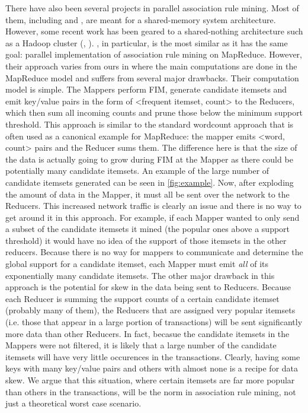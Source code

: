 \documentclass[11pt]{article}
\begin{document}
There have also been several projects in parallel association rule
mining. Most of them, including \cite{Agrawal1996} and
\cite{Zaki1997}, are meant for a shared-memory system architecture.
However, some recent work has been geared to a shared-nothing
architecture such as a Hadoop cluster (\cite{Li2008},
\cite{Li2011}). \cite{Yang2010}, in particular, is the most similar as
it has the same goal: parallel implementation of association rule
mining on MapReduce. However, their approach varies from ours in where
the main computations are done in the MapReduce model and suffers from
several major drawbacks. Their computation model is simple. The
Mappers perform FIM, generate candidate itemsets and emit key/value
pairs in the form of <frequent itemset, count> to the Reducers, which
then sum all incoming counts and prune those below the minimum support
threshold. This approach is similar to the standard wordcount approach
that is often used as a canonical example for MapReduce: the mapper
emits <word, count> pairs and the Reducer sums them. The difference
here is that the size of the data is actually going to grow during FIM
at the Mapper as there could be potentially many candidate
itemsets. An example of the large number of candidate itemsets
generated can be seen in \ref{fig:example}. Now, after exploding the
amount of data in the Mapper, it must all be sent over the network to
the Reducers. This increased network traffic is clearly an issue and
there is no way to get around it in this approach. For example, if
each Mapper wanted to only send a subset of the candidate itemsets it
mined (the popular ones above a support threshold) it would have no
idea of the support of those itemsets in the other reducers. Because
there is no way for mappers to communicate and determine the global
support for a candidate itemset, each Mapper must emit \emph{all} of
its exponentially many candidate itemsets. The other major drawback in
this approach is the potential for skew in the data being sent to
Reducers. Because each Reducer is summing the support counts of a
certain candidate itemset (probably many of them), the Reducers that
are assigned very popular itemsets (i.e. those that appear in a large
portion of transactions) will be sent significantly more data than
other Reducers. In fact, becasue the candidate itemsets in the Mappers
were not filtered, it is likely that a large number of the candidate
itemsets will have very little occurences in the
transactions. Clearly, having some keys with many key/value pairs and
others with almost none is a recipe for data skew. We argue that this
situation, where certain itemsets are far more popular than others in
the transactions, will be the norm in association rule mining, not
just a theoretical worst case scenario.
\end{document}
